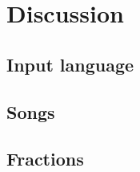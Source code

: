 \documentclass[a4paper]{article}
\begin{document}
% 

\section{Discussion}
\label{discussion}






\begin{appendices}

\section{Input language}
\subsection{Songs}
\label{input_songs}
\subsection{Fractions}
\label{input_fractions}

\end{appendices}
\end{document}
